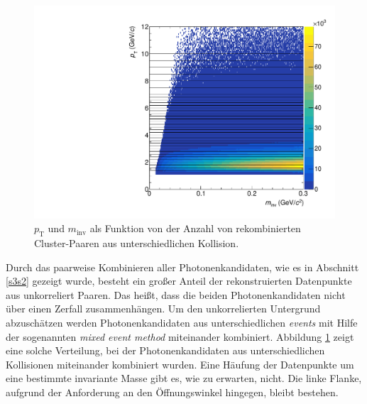\begin{figure}[tp]
\centering
\includegraphics[width=.7\linewidth]{hInvMass_pT_Bkg.pdf}
\caption{$p_\text{T}$ und $m_\text{inv}$ als Funktion von der Anzahl von rekombinierten  Cluster-Paaren aus unterschiedlichen Kollision.}
\label{figInvMassPt_b}
\end{figure}
Durch das paarweise Kombinieren aller Photonenkandidaten, wie es in Abschnitt \ref{s3s2} gezeigt wurde, besteht ein großer Anteil der rekonstruierten Datenpunkte aus unkorreliert Paaren.
Das heißt, dass die beiden Photonenkandidaten nicht über einen Zerfall zusammenhängen.
Um den unkorrelierten Untergrund abzuschätzen werden Photonenkandidaten aus unterschiedlichen \textit{events} mit Hilfe der sogenannten \textit{mixed event method} miteinander kombiniert.
Abbildung \ref{figInvMassPt_b} zeigt eine solche Verteilung, bei der Photonenkandidaten aus unterschiedlichen Kollisionen miteinander kombiniert wurden.
Eine Häufung der Datenpunkte um eine bestimmte invariante Masse gibt es, wie zu erwarten, nicht.
Die linke Flanke, aufgrund der Anforderung an den Öffnungswinkel hingegen, bleibt bestehen.
\newline
